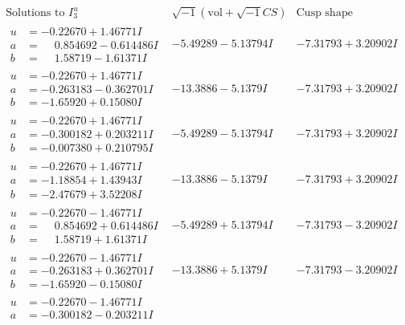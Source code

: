 \documentclass[1p]{elsarticle_modified}
\theoremstyle{definition}
\newcommand{\I}{\sqrt{-1}}
\begin{document}
$$\begin{array}{c|c|c}  
\text{Solutions to }I^u_{3}& \I (\text{vol} + \sqrt{-1}CS) & \text{Cusp shape}\\
 \hline 
\begin{aligned}
u &= -0.22670 + 1.46771 I \\
a &= \phantom{-}0.854692 - 0.614486 I \\
b &= \phantom{-}1.58719 - 1.61371 I\end{aligned}
 & -5.49289 - 5.13794 I & -7.31793 + 3.20902 I \\ \hline\begin{aligned}
u &= -0.22670 + 1.46771 I \\
a &= -0.263183 - 0.362701 I \\
b &= -1.65920 + 0.15080 I\end{aligned}
 & -13.3886 - 5.1379 I & -7.31793 + 3.20902 I \\ \hline\begin{aligned}
u &= -0.22670 + 1.46771 I \\
a &= -0.300182 + 0.203211 I \\
b &= -0.007380 + 0.210795 I\end{aligned}
 & -5.49289 - 5.13794 I & -7.31793 + 3.20902 I \\ \hline\begin{aligned}
u &= -0.22670 + 1.46771 I \\
a &= -1.18854 + 1.43943 I \\
b &= -2.47679 + 3.52208 I\end{aligned}
 & -13.3886 - 5.1379 I & -7.31793 + 3.20902 I \\ \hline\begin{aligned}
u &= -0.22670 - 1.46771 I \\
a &= \phantom{-}0.854692 + 0.614486 I \\
b &= \phantom{-}1.58719 + 1.61371 I\end{aligned}
 & -5.49289 + 5.13794 I & -7.31793 - 3.20902 I \\ \hline\begin{aligned}
u &= -0.22670 - 1.46771 I \\
a &= -0.263183 + 0.362701 I \\
b &= -1.65920 - 0.15080 I\end{aligned}
 & -13.3886 + 5.1379 I & -7.31793 - 3.20902 I \\ \hline\begin{aligned}
u &= -0.22670 - 1.46771 I \\
a &= -0.300182 - 0.203211 I \\

\end{aligned}
\end{array}$$
\end{document}
